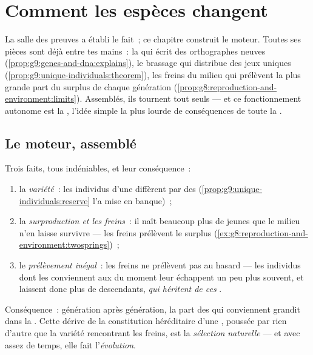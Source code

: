 \chapter{Comment les espèces changent}\label{ch:g9:how-species-change}

La salle des preuves a établi le fait~; ce chapitre
construit le moteur. Toutes ses pièces sont déjà entre tes
mains~: la  qui écrit des orthographes neuves
(\cref{prop:g9:genes-and-dna:explains}), le brassage qui
distribue des jeux uniques
(\cref{prop:g9:unique-individuals:theorem}), les freins du
milieu qui prélèvent la plus grande part du surplus de
chaque génération
(\cref{prop:g8:reproduction-and-environment:limits}).
Assemblés, ils tournent tout seuls --- et ce fonctionnement
autonome est la , l'idée simple la plus
lourde de conséquences de toute la .

\section{Le moteur, assemblé}

\begin{proposition}\label{prop:g9:how-species-change:selection}
Trois faits, tous indéniables, et leur conséquence~:
\begin{enumerate}
  \item la \emph{variété}~: les individus d'une 
        diffèrent par des 
        (\cref{prop:g9:unique-individuals:reserve} l'a mise
        en banque)~;
  \item la \emph{surproduction et les freins}~: il naît
        beaucoup plus de jeunes que le milieu n'en laisse
        survivre --- les freins prélèvent le surplus
        (\cref{ex:g8:reproduction-and-environment:twosprings})~;
  \item le \emph{prélèvement inégal}~: les freins ne
        prélèvent pas au hasard --- les individus dont les
         conviennent aux 
        du moment leur échappent un peu plus souvent, et
        laissent donc plus de descendants,
        \emph{qui héritent de ces }.
\end{enumerate}
Conséquence~: génération après génération, la part des
 qui conviennent grandit dans la . Cette
dérive de la constitution héréditaire d'une ,
poussée par rien d'autre que la variété rencontrant les
freins, est la \emph{sélection
naturelle} --- et avec assez de
temps, elle fait l'\emph{évolution}.
\end{proposition}
\admitted

